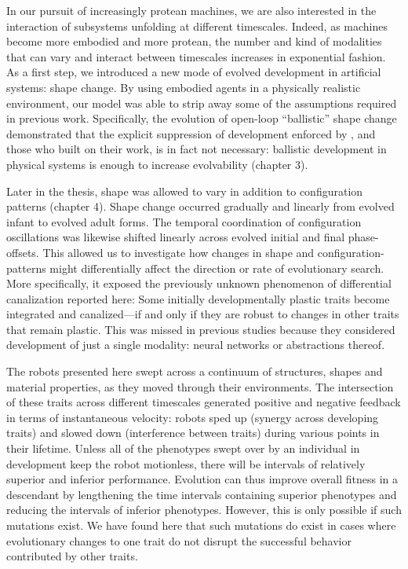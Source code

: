 In our pursuit of 
increasingly protean machines,
we are also interested in the interaction of subsystems unfolding at different timescales.
Indeed, as machines become more embodied \cite{klyubin2005empowerment} and more protean, the number and kind of modalities that can vary and interact between timescales increases in exponential fashion.
As a first step,
we introduced
a new mode of evolved development in artificial systems: shape change.
By using embodied agents in a physically realistic environment,
our model was able to strip away some of the assumptions required in previous work.
Specifically,
the evolution of open-loop ``ballistic'' shape change demonstrated that the explicit suppression of development enforced by \citet{hinton1987learning}, and those who built on their work,
is in fact not necessary: ballistic development in physical systems is enough to increase evolvability (chapter 3).


Later in the thesis, shape was allowed to vary in addition to configuration patterns (chapter 4).
Shape change occurred gradually and linearly from evolved infant to evolved adult forms.
The temporal coordination of configuration oscillations was likewise shifted linearly across evolved initial and final phase-offsets.
This allowed us to investigate how changes in shape and configuration-patterns might differentially affect the direction or rate of evolutionary search.
More specifically, it exposed the previously unknown phenomenon of differential canalization reported here:
Some initially developmentally plastic traits become integrated and canalized---if and only if they are robust to changes in other traits that remain plastic.
This was missed in previous studies because they considered development of just a single modality: neural networks or abstractions thereof.

The robots presented here 
swept across a continuum of structures, shapes and material properties,
as they
moved through their environments.
The intersection of these 
traits across different timescales generated positive and negative feedback in terms of instantaneous velocity: 
robots sped up (synergy across developing traits) and slowed down (interference between traits) during various points in their lifetime.
Unless all of the phenotypes swept over by an individual in development keep the robot motionless, there will be intervals of relatively superior and inferior performance.
Evolution can thus improve overall fitness in a descendant by lengthening the time intervals containing superior phenotypes and reducing the intervals of inferior phenotypes. 
However, this is only possible if such mutations exist.
We have found here that such mutations do exist in cases where evolutionary changes
to one trait do not disrupt the successful behavior contributed
by other traits.

